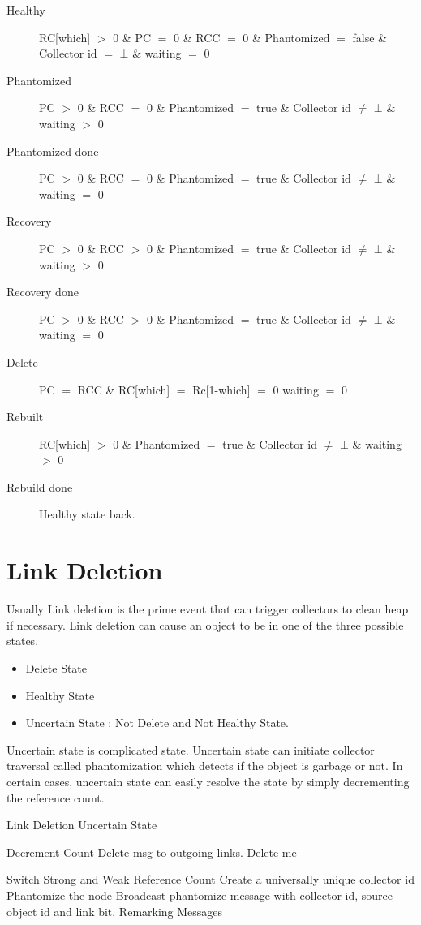 \documentclass{article}
\begin{document}
\begin{description}
  \item[Healthy] RC[which] $>$ 0 \& PC $=$ 0 \& RCC $=$ 0 \& Phantomized $=$ false \& Collector id $=$ $\bot$ \& waiting $=$ 0
  \item[Phantomized] PC $>$ 0 \& RCC $=$ 0 \& Phantomized $=$ true \& Collector id $\neq$ $\bot$ \& waiting $>$ 0
  \item[Phantomized done] PC $>$ 0 \& RCC $=$ 0 \& Phantomized $=$ true \& Collector id $\neq$ $\bot$ \& waiting $=$ 0
   \item[Recovery] PC $>$ 0 \& RCC $>$ 0 \& Phantomized $=$ true \& Collector id $\neq$ $\bot$ \& waiting $>$ 0
   \item[Recovery done] PC $>$ 0 \& RCC $>$ 0 \& Phantomized $=$ true \& Collector id $\neq$ $\bot$ \& waiting $=$ 0
  \item[Delete] PC $=$ RCC \& RC[which] $=$ Rc[1-which] $=$ 0 waiting $=$ 0
  \item[Rebuilt] RC[which] $>$ 0 \& Phantomized $=$ true \& Collector id $\neq$ $\bot$ \& waiting $>$ 0
  \item[Rebuild done] Healthy state back.

  
\end{description}
\section{Link Deletion}
	Usually Link deletion is the prime event that can trigger collectors to clean heap if necessary. Link deletion can cause an object to be in one of the three possible states. 
\begin{itemize}
  \item Delete State
  \item Healthy State
  \item Uncertain State : Not Delete and Not Healthy State.
\end{itemize}
	Uncertain state is complicated state. Uncertain state can initiate collector traversal called phantomization which detects if the object is garbage or not. In certain cases, uncertain state can easily resolve the state by simply decrementing the reference count. 

\begin{algorithm}
\caption{Link Deletion Uncertain State}
\label{Link Deletion}
\begin{algorithmic}[1]
\State Decrement Count
\State Delete msg to outgoing links.
\State Delete me
\EndIf

\State Switch Strong and Weak Reference Count
\State Create a universally unique collector id
\State Phantomize the node
\State Broadcast phantomize message with collector id, source object id and link bit.
\EndFor
\Else 
\State Remarking Messages
\EndIf
\EndProcedure
\end{algorithmic}
\end{algorithm}	
\end{document}
